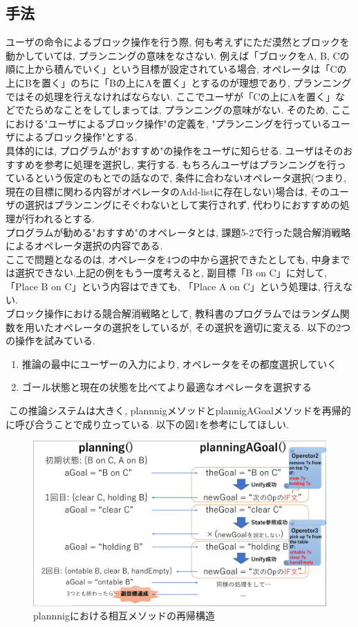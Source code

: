 \documentclass[uplatex,12pt]{jsarticle}
\begin{document}
\subsection{手法}
ユーザの命令によるブロック操作を行う際, 何も考えずにただ漠然とブロックを動かしていては, プランニングの意味をなさない. 例えば「ブロックをA, B, Cの順に上から積んでいく」という目標が設定されている場合, オペレータは「Cの上にBを置く」のちに「Bの上にAを置く」とするのが理想であり, プランニングではその処理を行えなければならない. ここでユーザが「Cの上にAを置く」などでたらめなことをしてしまっては, プランニングの意味がない. そのため, ここにおける"ユーザによるブロック操作"の定義を, "プランニングを行っているユーザによるブロック操作"とする. \\
具体的には, プログラムが"おすすめ"の操作をユーザに知らせる. ユーザはそのおすすめを参考に処理を選択し, 実行する. もちろんユーザはプランニングを行っているという仮定のもとでの話なので, 条件に合わないオペレータ選択(つまり, 現在の目標に関わる内容がオペレータのAdd-listに存在しない)場合は, そのユーザの選択はプランニングにそぐわないとして実行されず, 代わりにおすすめの処理が行われるとする.\\
プログラムが勧める"おすすめ"のオペレータとは, 課題5-2で行った競合解消戦略によるオペレータ選択の内容である.\\
​
​
ここで問題となるのは, オペレータを4つの中から選択できたとしても, 中身までは選択できない.上記の例をもう一度考えると, 副目標「B on C」に対して, 「Place B on C」という内容はできても, 「Place A on C」という処理は, 行えない. \\
​
​
ブロック操作における競合解消戦略として, 教科書のプログラムではランダム関数を用いたオペレータの選択をしているが, その選択を適切に変える. 以下の2つの操作を試みている.
​
\begin{enumerate}
\item 推論の最中にユーザーの入力により, オペレータをその都度選択していく
\item ゴール状態と現在の状態を比べてより最適なオペレータを選択する
\end{enumerate} 
​
この推論システムは大きく, plannnigメソッドとplannigAGoalメソッドを再帰的に呼び合うことで成り立っている.
以下の図1を参考にしてほしい.
\begin{figure}[htbp]
 \begin{center}
  \includegraphics[width = 12cm, pagebox = cropbox, clip]{images/planning.pdf}
 \end{center}
 \caption[]{plannnigにおける相互メソッドの再帰構造}\label{fig:fig1.1}
\end{figure}
\end{document}
